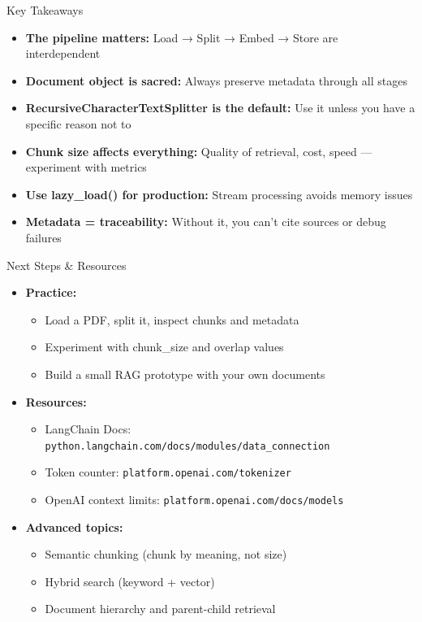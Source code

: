 \documentclass[aspectratio=169,11pt]{beamer}
\begin{document}
\begin{frame}{Key Takeaways}
  \begin{itemize}
    \setlength{\itemsep}{1pt}
    \item \textbf{The pipeline matters:} Load → Split → Embed → Store are interdependent

    \item \textbf{Document object is sacred:} Always preserve metadata through all stages

    \item \textbf{RecursiveCharacterTextSplitter is the default:} Use it unless you have a specific reason not to

    \item \textbf{Chunk size affects everything:} Quality of retrieval, cost, speed --- experiment with metrics

    \item \textbf{Use lazy\_load() for production:} Stream processing avoids memory issues

    \item \textbf{Metadata = traceability:} Without it, you can't cite sources or debug failures
  \end{itemize}
\end{frame}

\begin{frame}{Next Steps \& Resources}
  \begin{itemize}
    \setlength{\itemsep}{1pt}
    \item \textbf{Practice:}
    \begin{itemize}
    \setlength{\itemsep}{1pt}
      \item Load a PDF, split it, inspect chunks and metadata
      \item Experiment with chunk\_size and overlap values
      \item Build a small RAG prototype with your own documents
    \end{itemize}

    \item \textbf{Resources:}
    \begin{itemize}
    \setlength{\itemsep}{1pt}
      \item LangChain Docs: \texttt{python.langchain.com/docs/modules/data\_connection}
      \item Token counter: \texttt{platform.openai.com/tokenizer}
      \item OpenAI context limits: \texttt{platform.openai.com/docs/models}
    \end{itemize}

    \item \textbf{Advanced topics:}
    \begin{itemize}
    \setlength{\itemsep}{1pt}
      \item Semantic chunking (chunk by meaning, not size)
      \item Hybrid search (keyword + vector)
      \item Document hierarchy and parent-child retrieval
    \end{itemize}
  \end{itemize}
\end{frame}
\end{document}
